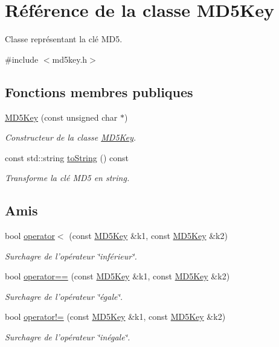 \hypertarget{class_m_d5_key}{\section{Référence de la classe M\-D5\-Key}
\label{class_m_d5_key}
}


Classe représentant la clé M\-D5.  




{\ttfamily \#include $<$md5key.\-h$>$}

\subsection*{Fonctions membres publiques}
\begin{DoxyCompactItemize}
\item 
\hyperlink{class_m_d5_key_a128484a209773db763f628f2dc8482fc}{M\-D5\-Key} (const unsigned char $\ast$)
\begin{DoxyCompactList}\small\item\em Constructeur de la classe \hyperlink{class_m_d5_key}{M\-D5\-Key}. \end{DoxyCompactList}\item 
const std\-::string \hyperlink{class_m_d5_key_a9f7ce0835cc0d70e316bf8152802c0a8}{to\-String} () const 
\begin{DoxyCompactList}\small\item\em Transforme la clé M\-D5 en string. \end{DoxyCompactList}\end{DoxyCompactItemize}
\subsection*{Amis}
\begin{DoxyCompactItemize}
\item 
bool \hyperlink{class_m_d5_key_ab9ea4f1611018c7e43e9ff0a704dec58}{operator$<$} (const \hyperlink{class_m_d5_key}{M\-D5\-Key} \&k1, const \hyperlink{class_m_d5_key}{M\-D5\-Key} \&k2)
\begin{DoxyCompactList}\small\item\em Surchagre de l'opérateur \char`\"{}inférieur\char`\"{}. \end{DoxyCompactList}\item 
bool \hyperlink{class_m_d5_key_aedad54e0b5f2363c0340a9bb5a62781e}{operator==} (const \hyperlink{class_m_d5_key}{M\-D5\-Key} \&k1, const \hyperlink{class_m_d5_key}{M\-D5\-Key} \&k2)
\begin{DoxyCompactList}\small\item\em Surchagre de l'opérateur \char`\"{}égale\char`\"{}. \end{DoxyCompactList}\item 
bool \hyperlink{class_m_d5_key_a911c35f88bf2d6ba464bb3c62d9b6b69}{operator!=} (const \hyperlink{class_m_d5_key}{M\-D5\-Key} \&k1, const \hyperlink{class_m_d5_key}{M\-D5\-Key} \&k2)
\begin{DoxyCompactList}\small\item\em Surchagre de l'opérateur \char`\"{}inégale\char`\"{}. \end{DoxyCompactList}\end{DoxyCompactItemize}


